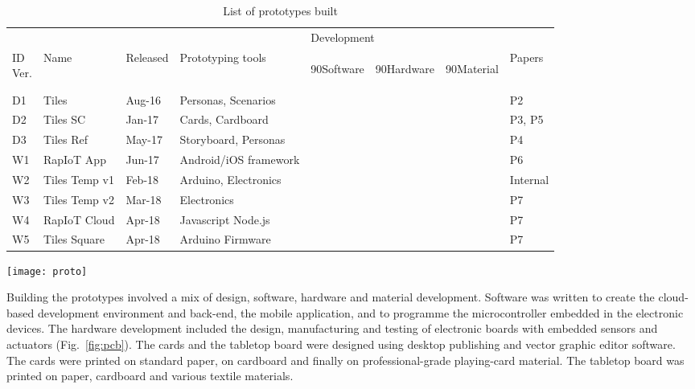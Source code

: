 \begin{table}
	[!p] \centering \caption{List of prototypes built} \label{tab:prototypes} 
	\begin{threeparttable}
		\begin{tabular}{@{}llllllll@{}} 
			\toprule 
			& & & & \multicolumn{3}{l}{Development}  \\
			\cline{5-7} \noalign{\smallskip} 
			\specialcell[b]{ID\\Ver.} & Name & Released & Prototyping tools & 
			\begin{turn}
				{90}Software
			\end{turn}
			& 
			\begin{turn}
				{90}Hardware
			\end{turn}
			& 
			\begin{turn}
				{90}Material
			\end{turn}
			& Papers \\
			\midrule \noalign{\smallskip} 
			D1 & Tiles & Aug-16 & Personas, Scenarios & & & \textbullet & P2 \\
			D2 & Tiles SC & Jan-17 & Cards, Cardboard & & & \textbullet & P3, P5 \\
			D3 & Tiles Ref & May-17 & Storyboard, Personas & & & \textbullet & P4 \\
			\hline \noalign{\smallskip} 
			W1 & RapIoT App & Jun-17 & Android/iOS framework & \textbullet & & & P6 \\
			W2 & Tiles Temp v1 & Feb-18 & Arduino, Electronics & \textbullet & \textbullet & & Internal \\
			W3 & Tiles Temp v2 & Mar-18 & Electronics & & \textbullet & & P7 \\
			W4 & RapIoT Cloud & Apr-18 & Javascript Node.js & \textbullet & & & P7 \\
			W5 & Tiles Square & Apr-18 & Arduino Firmware & \textbullet & & & P7 \\
			\bottomrule 
		\end{tabular}
		\begin{tablenotes}
			\item
			\texttt{[image: proto]}
		\end{tablenotes}
	\end{threeparttable}
\end{table}

Building the prototypes involved a mix of design, software, hardware and material development. Software was written to create the cloud-based development environment and back-end, the mobile application, and to programme the microcontroller embedded in the electronic devices. The hardware development included the design, manufacturing and testing of electronic boards with embedded sensors and actuators (Fig.~\ref{fig:pcb}). The cards and the tabletop board were designed using desktop publishing and vector graphic editor software. The cards were printed on standard paper, on cardboard and finally on professional-grade playing-card material. The tabletop board was printed on paper, cardboard and various textile materials.

